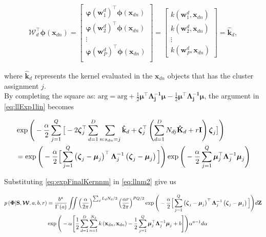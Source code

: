 \documentclass[]{article}
\newcommand{\kernel}[2]{k\left(#1,#2\right)}
\newcommand{\kernelwx}[1]{k\left(\mathbf{w}_{#1}^d,\indobj\right)}
\newcommand{\Z}{\boldsymbol{\mathrm{Z}}}
\newcommand{\C}{\boldsymbol{\Lambda}_j}
\newcommand{\muJ}{\boldsymbol{\mu}_j}
\newcommand{\gammaA}{\Gamma\left(a\right)}
\newcommand{\eye}{\mathbf{I}}
\newcommand{\Scluster}{\mathbf{S}}
\newcommand{\W}{\boldsymbol{\mathcal{W}}}
\newcommand{\indobj}{\mathbf{x}_{dn}}
\newcommand{\projMat}{\boldsymbol{\mathcal{W}}_d}
\newcommand{\lvec}{\boldsymbol{\zeta}_j}
\newcommand{\phixnd}{\boldsymbol{\phi}\left(\indobj\right)}
\newcommand{\phiwld}[1]{\boldsymbol{\varphi}\left(\mathbf{w}_{#1}^d\right)}
\newcommand{\kawx}{\mathbf{\hat{k}}_d }
\newcommand{\Kaww}{\mathbf{\hat{K}}_d }
\begin{document}
\begin{align}
 \projMat^\top \phixnd = 
 \left[ \begin{matrix}
	\phiwld{1}^\top\phixnd\\
  \phiwld{2}^\top\phixnd\\
  \vdots\\
  \phiwld{P}^\top\phixnd\\
  \end{matrix}\right]
= 
\left[ \begin{matrix}
 \kernelwx{1}\\
 \kernelwx{2}\\
 \vdots\\
 \kernelwx{P} 
 \end{matrix}\right] = \mathbf{\hat{k}}_d, \label{eq:kp}
\end{align}

where $\kawx$ represents the kernel evaluated in the $\indobj$ objects that has the cluster assignment $j$.\\

By completing the square as: $\textrm{arg} = \textrm{arg} + \frac{1}{2}\boldsymbol{\mu}^\top\boldsymbol{\C^{-1}}\boldsymbol{\mu} -\frac{1}{2}\boldsymbol{\mu}^\top\boldsymbol{\C^{-1}}\boldsymbol{\mu}$, the argument in \eqref{eq:llExp1lin} becomes

\begin{align}
&\exp\Bigg(-\frac{\alpha}{2}\sum_{j=1}^Q \big[ -2 \lvec ^\top  \sum_{d=1}^{D} \sum_{n:s_{dn}=j}\kawx+\lvec^\top  \left(\sum_{d=1}^{D} N_{dj}\Kaww + r\eye\right) \lvec \big]\Bigg) \notag\\ &= \exp\Bigg(-\frac{\alpha}{2}\Big[\sum_{j=1}^{Q} \left(\lvec-\muJ\right)^\top\C^{-1}\left(\lvec-\muJ\right)\Big]\Bigg)
\exp\Bigg(-\frac{\alpha}{2}\sum_{j=1}^{Q}\muJ^\top\C^{-1}\muJ\Bigg) \label{eq:expFinalKernnm}
\end{align}


Substituting \eqref{eq:expFinalKernnm} in \eqref{eq:llnm2} give us

\begin{align}
p\left(\boldsymbol{\Phi}|\Scluster,\W,a,b,r\right)&=\frac{b^a}{\gammaA}\iint \left(\frac{\alpha}{2\pi}\right)^{\sum_d L_d N_d /2}\left(\frac{\alpha r}{2\pi}\right)^{PQ/2}\exp\Bigg(-\frac{\alpha}{2}\Big[\sum_{j=1}^{Q} \left(\lvec-\muJ\right)^\top\C^{-1}\left(\lvec-\muJ\right)\Big]\Bigg)d\Z \notag\\
&\exp\Bigg(-\alpha\Bigg[\frac{1}{2} \sum_{d=1}^{D}\sum_{n=1}^{N_d}\kernel{\indobj}{\indobj}  -\frac{1}{2}\sum_{j=1}^{Q}\muJ^\top\C^{-1}\muJ +b \Bigg]\Bigg)\alpha^{a-1}d\alpha \label{eq:llFinalIntegralsnm}
\end{align}
\end{document}
